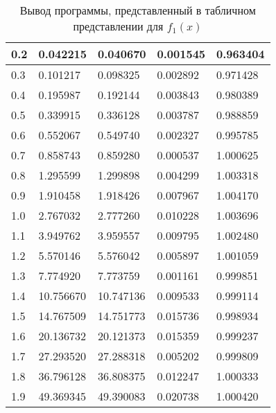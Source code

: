 \documentclass[13pt, a4paper, twoside]{article}
\begin{document}
\begin{table}[!ht]
\begin{tabular}{|l|l|l|l|l|}
        0.2 & 0.042215 & 0.040670 & 0.001545 & 0.963404 \\ \hline
        0.3 & 0.101217 & 0.098325 & 0.002892 & 0.971428 \\ \hline
        0.4 & 0.195987 & 0.192144 & 0.003843 & 0.980389 \\ \hline
        0.5 & 0.339915 & 0.336128 & 0.003787 & 0.988859 \\ \hline
        0.6 & 0.552067 & 0.549740 & 0.002327 & 0.995785 \\ \hline
        0.7 & 0.858743 & 0.859280 & 0.000537 & 1.000625 \\ \hline
        0.8 & 1.295599 & 1.299898 & 0.004299 & 1.003318 \\ \hline
        0.9 & 1.910458 & 1.918426 & 0.007967 & 1.004170 \\ \hline
        1.0 & 2.767032 & 2.777260 & 0.010228 & 1.003696 \\ \hline
        1.1 & 3.949762 & 3.959557 & 0.009795 & 1.002480 \\ \hline
        1.2 & 5.570146 & 5.576042 & 0.005897 & 1.001059 \\ \hline
        1.3 & 7.774920 & 7.773759 & 0.001161 & 0.999851 \\ \hline
        1.4 & 10.756670 & 10.747136 & 0.009533 & 0.999114 \\ \hline
        1.5 & 14.767509 & 14.751773 & 0.015736 & 0.998934 \\ \hline
        1.6 & 20.136732 & 20.121373 & 0.015359 & 0.999237 \\ \hline
        1.7 & 27.293520 & 27.288318 & 0.005202 & 0.999809 \\ \hline
        1.8 & 36.796128 & 36.808375 & 0.012247 & 1.000333 \\ \hline
        1.9 & 49.369345 & 49.390083 & 0.020738 & 1.000420 \\ \hline
    \end{tabular}
    \caption{Вывод программы, представленный в табличном представлении для $f_1(x)$}
\end{table}
\end{document}
